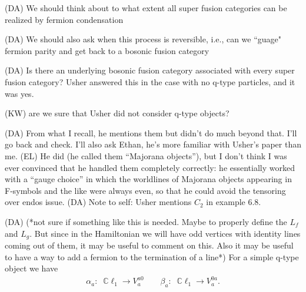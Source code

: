 \documentclass[12pt,a4paper]{article}
\newcounter{arrow}
\newcommand{\dave}[1]{{\color{ao(english)}\footnotesize{(DA) #1}}}
\newcommand{\ethan}[1]{{\color{amethyst}\footnotesize{(EL) #1}}}
\newcommand{\kw}[1]{{\color{kwcolor}\footnotesize{(KW) #1}}}
\begin{document}
\dave{We should think about to what extent all super fusion categories can be realized by fermion condensation}

\dave{We should also ask when this process is reversible, i.e., can we ``guage" fermion parity and get back to a bosonic fusion category}

\dave{Is there an underlying bosonic fusion category associated with every super fusion category? Usher answered this in the case with no q-type particles, and it was yes.} 

\kw{are we sure that Usher did not consider q-type objects?}

\dave{From what I recall, he mentions them but didn't do much beyond that. I'll go back and check. I'll also ask Ethan, he's more familiar with Usher's paper than me.} \ethan{He did (he called them ``Majorana objects''), but I don't think I was ever convinced that he handled them completely correctly: he essentially worked with a ``gauge choice'' in which the worldlines of Majorana objects appearing in F-symbols and the like were always even, so that he could avoid the tensoring over endos issue.} \dave{Note to self: Usher mentions $C_2$ in example 6.8.}

\dave{(*not sure if something like this is needed. Maybe to properly define the $L_f$ and $L_g$. But since in the Hamiltonian we will have odd vertices with identity lines coming out of them, it may be useful to comment on this. Also it may be useful to have a way to add a fermion to the termination of a line*)
For a simple q-type object we have
\begin{align}
\alpha_a: \; \; \mathbb{C} \ell_1 \rightarrow V^{a 0 }_a \quad \quad \beta_a: \; \; \mathbb{C} \ell_1 \rightarrow V^{0a }_a.
\end{align}
}
\end{document}

